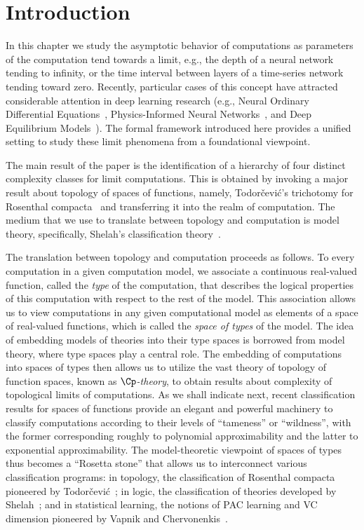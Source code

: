 
\section{Introduction}\label{sec:deep_comp_intro}

In this chapter we study the asymptotic behavior of computations as parameters of the computation tend towards a limit, e.g., the depth of a neural network tending to infinity, or the time interval between layers of a time-series network tending toward zero.
Recently, particular cases of this concept have attracted considerable attention in deep learning research (e.g., Neural Ordinary Differential Equations~\cite{Chen:2018}, Physics-Informed Neural Networks~\cite{Raissi-Perdikaris-Karniadakis:2019}, and Deep Equilibrium Models~\cite{Bai:2019}).
The formal framework introduced here provides a unified setting to study these limit phenomena from a foundational viewpoint.

The main result of the paper is the identification of a hierarchy of four distinct complexity classes for limit computations.
This is obtained by invoking a major result about topology of spaces of functions, namely,
Todorčević's trichotomy for Rosenthal compacta~\cite{Todorcevic_1999_CompactSubsetsBaire} and transferring it into the realm of computation.
The medium that we use to translate between topology and computation is model theory, specifically, Shelah's classification theory~\cite{Shelah:1990}.

The translation between topology and computation proceeds as follows.
To every computation in a given computation model, we associate a continuous real-valued function, called the \emph{type} of the computation, that describes the logical properties of this computation with respect to the rest of the model.
This association allows us to view computations in any given computational model as elements of a space of real-valued functions, which is called the \emph{space of types} of the model.
The idea of embedding models of theories into their type spaces is borrowed from model theory, where type spaces play a central role.
The embedding of computations into spaces of types then allows us to utilize the vast theory of topology of function spaces, known as \emph{$\Cp$-theory}, to obtain results about complexity of topological limits of computations.
As we shall indicate next, recent classification results for spaces of functions provide an elegant and powerful machinery to classify computations according to their levels of ``tameness'' or ``wildness'', with the former corresponding roughly to polynomial approximability and the latter to exponential approximability.
The model-theoretic viewpoint of spaces of types thus becomes a ``Rosetta stone'' that allows us to interconnect various classification programs: 
in topology, the classification of Rosenthal compacta pioneered by Todorčević~\cite{Todorcevic_1999_CompactSubsetsBaire}; 
in logic, the classification of theories developed by Shelah~\cite{Shelah:1990}; and in statistical learning, the notions of PAC learning and VC dimension pioneered by Vapnik and Chervonenkis~\cite{Vapnik-Chervonenkis:1974, Vapnik-Chervonenkis:1971}.

